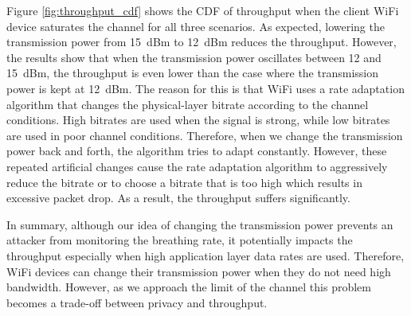 Figure \ref{fig:throughput_cdf} shows the CDF of throughput when the client WiFi device saturates the channel for all three scenarios. As expected, lowering the transmission power from 15~dBm to 12~dBm reduces the throughput. However, the results show that when the transmission power oscillates between 12 and 15~dBm, the throughput is even lower than the case where the transmission power is kept at 12~dBm. The reason for this is that WiFi uses a rate adaptation algorithm that changes the physical-layer bitrate according to the channel conditions. High bitrates are used when the signal is strong, while low bitrates are used in poor channel conditions. Therefore, when we change the transmission power back and forth, the algorithm tries to adapt constantly. However, these repeated artificial changes cause the rate adaptation algorithm to aggressively reduce the bitrate or to choose a bitrate that is too high which results in excessive packet drop. As a result, the throughput suffers significantly.

In summary, although our idea of changing the transmission power prevents an attacker from monitoring the breathing rate, it potentially impacts the throughput especially when high application layer data rates are used.
Therefore, WiFi devices can change their transmission power when they do not need high bandwidth. However, as we approach the limit of the channel this problem becomes a trade-off between privacy and throughput.

 






